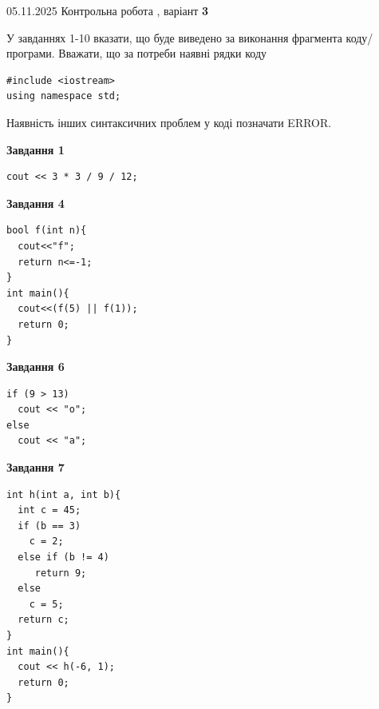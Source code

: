 \documentclass[12pt, ukrainian]{article}
\begin{document}
{\Large{05.11.2025 Контрольна робота , варіант  \No \textbf { 3 }\par}}
{
\begin {large}
У завданнях 1-10 вказати, що буде виведено за виконання фрагмента коду/про\-гра\-ми.
Вважати, що за потреби наявні рядки коду
\begin{verbatim}
#include <iostream>
using namespace std;
\end{verbatim}
Наявність інших синтаксичних проблем у коді позначати ERROR.

\begin{minipage}[t]{7.0cm}

\begin{center}
\textbf{Завдання 1}
\end{center}
\vspace{-8mm}

\begin{verbatim}
cout << 3 * 3 / 9 / 12;
\end{verbatim}



\begin{center}
\textbf{Завдання 4}
\end{center}
\vspace{-8mm}

\begin{verbatim}
bool f(int n){
  cout<<"f";
  return n<=-1;
}
int main(){
  cout<<(f(5) || f(1));
  return 0;
}
\end{verbatim}



\begin{center}
\textbf{Завдання 6}
\end{center}
\vspace{-8mm}

\begin{verbatim}
if (9 > 13)
  cout << "o";
else
  cout << "a";
\end{verbatim}



\begin{center}
\textbf{Завдання 7}
\end{center}
\vspace{-8mm}

\begin{verbatim}
int h(int a, int b){
  int c = 45;
  if (b == 3)
    c = 2;
  else if (b != 4)
     return 9;
  else
    c = 5;
  return c;
}
int main(){
  cout << h(-6, 1);
  return 0;
}
\end{verbatim}


\end{minipage}
\end{large}}
\end{document}

